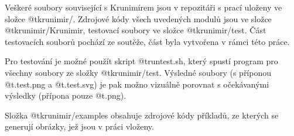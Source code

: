 Veškeré soubory související s Krunimírem jsou v repozitáři s prací uloženy
ve složce @t{krunimir/}. Zdrojové kódy všech uvedených modulů jsou ve složce
@t{krunimir/Krunimir}, testovací soubory ve složce @t{krunimir/test}. Část
testovacích souborů pochází ze soutěže, část byla vytvořena v rámci této práce.

Pro testování je možné použít skript @t{runtest.sh}, který spustí program pro
všechny soubory ze složky @t{krunimir/test}. Výsledné soubory (s příponou
@t{.test.png} a @t{.test.svg}) je pak možno vizuálně porovnat s očekávanými
výsledky (přípona pouze @t{.png}).

Složka @t{krunimir/examples} obsahuje zdrojové kódy příkladů, ze kterých se
generují obrázky, jež jsou v práci vloženy.
